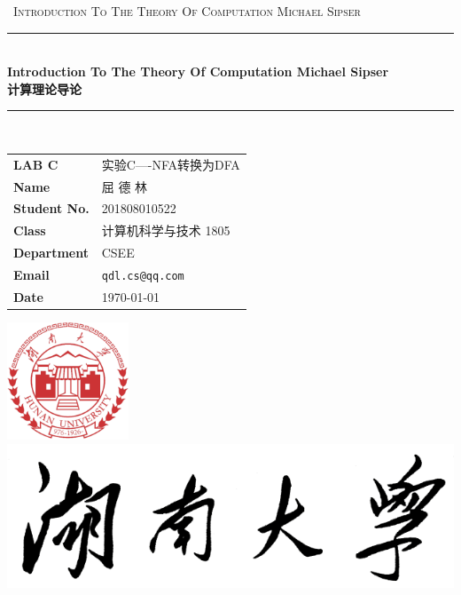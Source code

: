 \documentclass{hnureport}
\begin{document}
\begin{titlepage}
    \clearpage\thispagestyle{empty}
    \centering
    \vspace{1cm}
    {\
        \textsc{Introduction To The Theory Of Computation Michael Sipser}
    }
    \vspace{2.5cm}
    
    \rule{\linewidth}{2mm} \\[0.5cm]
    { \Huge \bfseries Introduction To The Theory Of Computation Michael Sipser\\[0.2em]
        计算理论导论}\\[0.5cm]
    \rule{\linewidth}{0.6mm} \\[1.5cm]
    
    \hspace{2cm}
    \begin{tabular}{l p{5cm}}
        \textbf{LAB C} & 实验C----NFA转换为DFA \\[10pt]
        \textbf{Name} & 屈 德 林 \\[10pt]
        \textbf{Student No.} & 201808010522 \\[10pt]
        \textbf{Class} & 计算机科学与技术 1805 \\[10pt]
        \textbf{Department} & CSEE \\[10pt]
        \textbf{Email} & \texttt{qdl.cs@qq.com} \\[10pt]
        \textbf{Date} & \today \\            
    \end{tabular}
    
    \vfill
    \centering \includegraphics[height=3.5cm]{Figure/HNUlogo.pdf}\\ %
    \centering \includegraphics[scale=0.3]{Figure/logo_slogan.png}
    \vspace{0.5cm}

    \pagebreak
\end{titlepage}

\thispagestyle{empty}
\tableofcontents
\newpage 
\setcounter{page}{1}


\newpage

\newpage


\appendix

\end{document}
